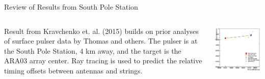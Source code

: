 \documentclass{beamer}
\begin{document}
\begin{frame}{Review of Results from South Pole Station}
\begin{columns}[T]
\begin{column}{0.5\textwidth}
Result from Kravchenko et. al. (2015) builds on prior analyses of surface pulser data by Thomas and others.  The pulser is at the South Pole Station, 4 km away, and the target is the ARA03 array center.  Ray tracing is used to predict the relative timing offsets between antennas and strings.
\end{column}
\begin{column}{0.5\textwidth}
\begin{center}
\includegraphics[width=\textwidth]{southpoleSetup.png}
\end{center}
\end{column}
\end{columns}
\end{frame}
\end{document}
